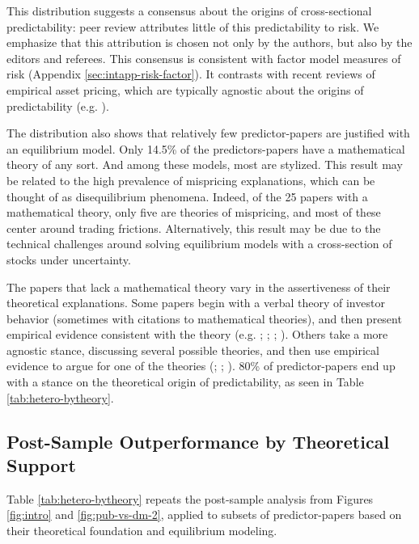 This distribution suggests a consensus about the origins of cross-sectional predictability: peer review attributes little of this predictability to risk. We emphasize that this attribution is chosen not only by the authors, but also by the editors and referees. This consensus is consistent with factor model measures of risk (Appendix \ref{sec:intapp-risk-factor}). It contrasts with recent reviews of empirical asset pricing, which are typically agnostic about the origins of predictability (e.g. \citealt{bali2016empirical,zaffaroni2022asset}). 

The distribution also shows that relatively few predictor-papers are justified with an equilibrium model. Only 14.5\% of the predictors-papers have a mathematical theory of any sort. And among these models, most are stylized. This result may be related to the high prevalence of mispricing explanations, which can be thought of as disequilibrium phenomena. Indeed, of the 25 papers with a mathematical theory, only five are theories of mispricing, and most of these center around trading frictions. Alternatively, this result may be due to the technical challenges around solving equilibrium models with a cross-section of stocks under uncertainty. 

The papers that lack a mathematical theory vary in the assertiveness of their theoretical explanations. Some papers begin with a verbal theory of investor behavior (sometimes with citations to mathematical theories), and then present empirical evidence consistent with the theory (e.g. \citealt{sloan1996stock}; \citealt{asquith2005short}; \citealt{bali2011maxing}; \citealt{eberhart2004examination}). Others take a more agnostic stance, discussing several possible theories, and then use empirical evidence to argue for one of the theories (\citealt{spiess1999long}; \citealt{titman2004capital}; \citealt{chan1996momentum}). 80\% of predictor-papers end up with a stance on the theoretical origin of predictability, as seen in Table \ref{tab:hetero-bytheory}. 

\subsection{Post-Sample Outperformance by Theoretical Support}\label{sec:hetero-mispricing}

Table \ref{tab:hetero-bytheory} repeats the post-sample analysis from Figures \ref{fig:intro} and \ref{fig:pub-vs-dm-2}, applied to subsets of predictor-papers based on their theoretical foundation and equilibrium modeling.

